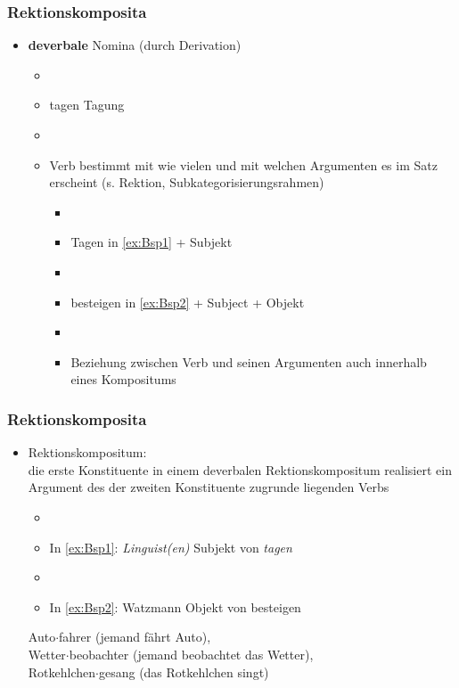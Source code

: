 \begin{frame}
\frametitle{Rektionskomposita}

\begin{itemize}
	\item \textbf{deverbale} Nomina (durch Derivation)
	
	\begin{itemize}
		\item[]
		\item tagen \ras Tagung
		\item[]
		\item Verb bestimmt mit wie vielen und mit welchen Argumenten es im Satz erscheint (s. Rektion, Subkategorisierungsrahmen)
		
		\begin{itemize}
			\item[]
			\item Tagen in \ref{ex:Bsp1} + Subjekt
			\item[]
			\item besteigen in \ref{ex:Bsp2} + Subject + Objekt
			\item[]
			\item Beziehung zwischen Verb und seinen Argumenten auch innerhalb eines Kompositums
		\end{itemize}
	\end{itemize}
\end{itemize}


\end{frame}


\begin{frame}
\frametitle{Rektionskomposita}

\begin{itemize}
	\item Rektionskompositum: \\
	die erste Konstituente in einem deverbalen Rektionskompositum realisiert ein Argument des der zweiten Konstituente zugrunde liegenden Verbs
	
	\begin{itemize}
		\item[]
		\item In \ref{ex:Bsp1}: \emph{Linguist(en)} \ras Subjekt von \emph{tagen}
		\item[]
		\item In \ref{ex:Bsp2}: Watzmann \ras Objekt von besteigen
	\end{itemize}
	
	\ea	 Auto$\cdot$fahrer (jemand fährt Auto), \\
		 Wetter$\cdot$beobachter (jemand beobachtet das Wetter), \\
		 Rotkehlchen$\cdot$gesang (das Rotkehlchen singt)
	\z
		 
\end{itemize}


\end{frame}


